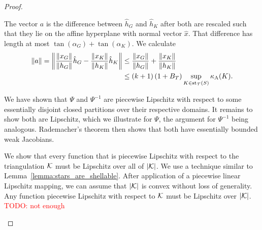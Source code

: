 \documentclass[10pt,letterpaper]{article}
\newcommand{\todo}[1]{\textcolor{red}{TODO: #1}}
\begin{document}
\begin{proof}
\begin{itemize}
        
        
        The vector $a$ is the difference between $\hat h_{G}$ and $\hat h_{K}$ after both are rescaled such that they lie on the affine hyperplane with normal vector $\hat x$. That difference has length at most $\tan(\alpha_{G}) + \tan(\alpha_{K})$.
        We calculate 
        \begin{align*}
            \|a\|
            = 
            \left\|
            \frac{\|x_{G}\|}{\|h_{G}\|} \hat h_{{G}} 
            - 
            \frac{\|x_{K}\|}{\|h_{K}\|} \hat h_K
            \right\|
            &
            \leq 
            \frac{\|x_{G}\|}{\|h_{G}\|} 
            + 
            \frac{\|x_{K}\|}{\|h_{K}\|} 
            \\&
            \leq 
            (k+1) 
            \left( 1 + B_{T} \right)
            \sup_{ K \in \patch_{\calT}(S) }
            \kappa_{\maxcol}(K) %
            .
        \end{align*}
        
        We have shown that $\Psi$ and $\Psi^{-1}$ are piecewise Lipschitz with respect to some essentially disjoint closed partitions over their respective domains.
        It remains to show both are Lipschitz, which we illustrate for $\Psi$, the argument for $\Psi^{-1}$ being analogous. 
        Rademacher's theorem then shows that both have essentially bounded weak Jacobians. 
        
        We show that every function that is piecewise Lipschitz with respect to the triangulation ${\mathcal K}$ must be Lipschitz over all of $|{\mathcal K}|$. 
        We use a technique similar to Lemma~\ref{lemma:stars_are_shellable}. 
        After application of a piecewise linear Lipschitz mapping, 
        we can assume that $|{\mathcal K}|$ is convex without loss of generality. 
        Any function piecewise Lipschitz with respect to ${\mathcal K}$ must be Lipschitz over $|{\mathcal K}|$. 
        \todo{not enough}
        

\end{itemize}
\end{proof}
\end{document}
